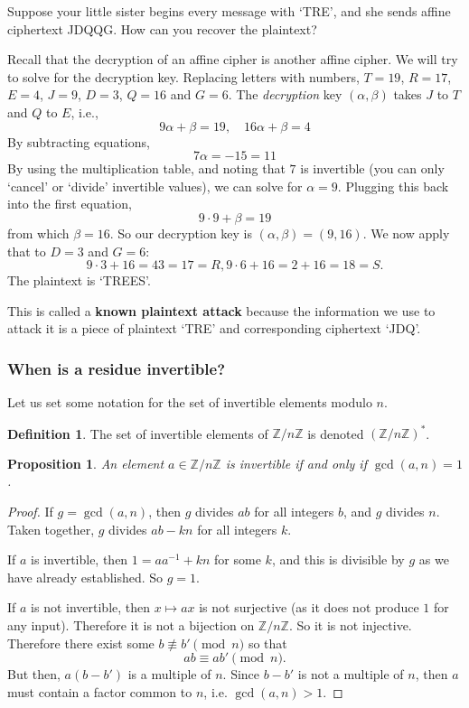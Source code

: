 \documentclass{article}
\theoremstyle{plain}
\newtheorem{proposition}[theorem]{Proposition}
\theoremstyle{definition}
\newtheorem{definition}[theorem]{Definition}
\theoremstyle{remark}
\numberwithin{theorem}{section}
\newcommand{\ZZ}{\mathbb{Z}}
\begin{document}
Suppose your little sister begins every message with `TRE', and she sends affine ciphertext JDQQG.  How can you recover the plaintext?

Recall that the decryption of an affine cipher is another affine cipher.  We will try to solve for the decryption key.  Replacing letters with numbers, $T = 19$, $R=17$, $E=4$, $J=9$, $D= 3$, $Q = 16$ and $G = 6$.  The \emph{decryption} key $(\alpha,\beta)$ takes $J$ to $T$ and $Q$ to $E$, i.e.,
\[
	9 \alpha + \beta = 19, \quad 16 \alpha + \beta = 4
\]
By subtracting equations,
\[
	7 \alpha = -15 = 11
\]
By using the multiplication table, and noting that $7$ is invertible (you can only `cancel' or `divide' invertible values), we can solve for $\alpha = 9$.
Plugging this back into the first equation,
\[
	9 \cdot 9 + \beta = 19
\]
from which $\beta = 16$.  So our decryption key is $(\alpha, \beta) = (9,16)$.  We now apply that to $D = 3$ and $G = 6$:
\[
	9 \cdot 3 + 16 = 43 = 17 = R, 9 \cdot 6 + 16 = 2 + 16 = 18 = S.
\]
The plaintext is `TREES'.

This is called a \textbf{known plaintext attack} because the information we use to attack it is a piece of plaintext `TRE' and corresponding ciphertext `JDQ'.



\subsubsection{When is a residue invertible?}

Let us set some notation for the set of invertible elements modulo $n$.

\begin{definition}
	The set of invertible elements of $\ZZ/n\ZZ$ is denoted $(\ZZ/n\ZZ)^*$.
\end{definition}

\begin{proposition}
	An element $a \in \ZZ/n\ZZ$ is invertible if and only if $\gcd(a,n)=1$.
\end{proposition}

\begin{proof}
	If $g = \gcd(a,n)$, then $g$ divides $ab$ for all integers $b$, and $g$ divides $n$.  Taken together, $g$ divides $ab - kn$ for all integers $k$.

	If $a$ is invertible, then $1 = aa^{-1} + kn$ for some $k$, and this is divisible by $g$ as we have already established.  So $g=1$.

	If $a$ is not invertible, then $x \mapsto ax$ is not surjective (as it does not produce $1$ for any input).  Therefore it is not a bijection on $\ZZ/n\ZZ$.  So it is not injective.  Therefore there exist some $b \not\equiv b' \pmod n$ so that 
	\[
		ab \equiv ab' \pmod n.
		\]
		But then, $a(b-b')$ is a multiple of $n$.  Since $b-b'$ is not a multiple of $n$, then $a$ must contain a factor common to $n$, i.e. $\gcd(a,n)>1$.
\end{proof}
\end{document}
